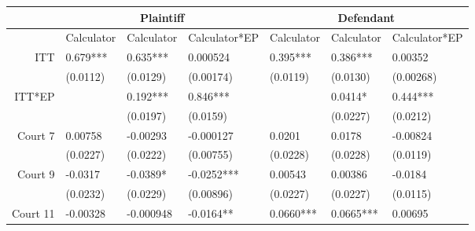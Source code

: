 \begin{tabular}{rrrrrrr}
\toprule
      & \multicolumn{3}{c}{Plaintiff} & \multicolumn{3}{c}{Defendant} \\
\midrule
      & \multicolumn{1}{c}{Calculator} & \multicolumn{1}{c}{Calculator} & \multicolumn{1}{c}{Calculator*EP} & \multicolumn{1}{c}{Calculator} & \multicolumn{1}{c}{Calculator} & \multicolumn{1}{c}{Calculator*EP} \\
      \midrule
      \midrule
ITT   & \multicolumn{1}{l}{0.679***} & \multicolumn{1}{l}{0.635***} & \multicolumn{1}{l}{0.000524} & \multicolumn{1}{l}{0.395***} & \multicolumn{1}{l}{0.386***} & \multicolumn{1}{l}{0.00352} \\
      & \multicolumn{1}{l}{(0.0112)} & \multicolumn{1}{l}{(0.0129)} & \multicolumn{1}{l}{(0.00174)} & \multicolumn{1}{l}{(0.0119)} & \multicolumn{1}{l}{(0.0130)} & \multicolumn{1}{l}{(0.00268)} \\
ITT*EP & \multicolumn{1}{l}{} & \multicolumn{1}{l}{0.192***} & \multicolumn{1}{l}{0.846***} & \multicolumn{1}{l}{} & \multicolumn{1}{l}{0.0414*} & \multicolumn{1}{l}{0.444***} \\
      & \multicolumn{1}{l}{} & \multicolumn{1}{l}{(0.0197)} & \multicolumn{1}{l}{(0.0159)} & \multicolumn{1}{l}{} & \multicolumn{1}{l}{(0.0227)} & \multicolumn{1}{l}{(0.0212)} \\
Court 7 & \multicolumn{1}{l}{0.00758} & \multicolumn{1}{l}{-0.00293} & \multicolumn{1}{l}{-0.000127} & \multicolumn{1}{l}{0.0201} & \multicolumn{1}{l}{0.0178} & \multicolumn{1}{l}{-0.00824} \\
      & \multicolumn{1}{l}{(0.0227)} & \multicolumn{1}{l}{(0.0222)} & \multicolumn{1}{l}{(0.00755)} & \multicolumn{1}{l}{(0.0228)} & \multicolumn{1}{l}{(0.0228)} & \multicolumn{1}{l}{(0.0119)} \\
Court 9 & \multicolumn{1}{l}{-0.0317} & \multicolumn{1}{l}{-0.0389*} & \multicolumn{1}{l}{-0.0252***} & \multicolumn{1}{l}{0.00543} & \multicolumn{1}{l}{0.00386} & \multicolumn{1}{l}{-0.0184} \\
      & \multicolumn{1}{l}{(0.0232)} & \multicolumn{1}{l}{(0.0229)} & \multicolumn{1}{l}{(0.00896)} & \multicolumn{1}{l}{(0.0227)} & \multicolumn{1}{l}{(0.0227)} & \multicolumn{1}{l}{(0.0115)} \\
Court 11 & \multicolumn{1}{l}{-0.00328} & \multicolumn{1}{l}{-0.000948} & \multicolumn{1}{l}{-0.0164**} & \multicolumn{1}{l}{0.0660***} & \multicolumn{1}{l}{0.0665***} & \multicolumn{1}{l}{0.00695} \\

\end{tabular}
